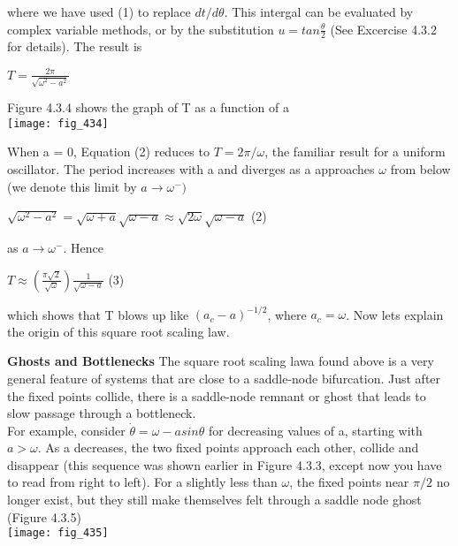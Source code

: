 \documentclass{article}
\newcommand\tab[1][1cm]{\hspace*{#1}}
\begin{document}
where we have used (1) to replace $dt/d\theta$. This intergal can be evaluated by complex variable methods, or by the substitution $u= tan \frac{\theta}{2}$ (See Excercise 4.3.2 for details). The result is 
\begin{center}
$T=\frac{2\pi}{\sqrt{\omega^{2}-a^{2}}}$
\end{center}

Figure 4.3.4 shows the graph of T as a function of a
\\ 

\texttt{[image: fig\_434]}

When a = 0, Equation (2) reduces to $T=2\pi/\omega$, the familiar result for a uniform oscillator. The period increases with a and diverges as a approaches $\omega$ from below (we denote this limit by $a \to \omega^{-})$ 
\begin{center}
$\sqrt{\omega^{2}-a^{2}}=\sqrt{\omega+a}\sqrt{\omega-a} \approx \sqrt{2\omega}\sqrt{\omega-a}$ \tab (2)
\end{center}
as $a \to \omega^{-}$. Hence 
\begin{center}
$T \approx (\frac{\pi \sqrt{2}}{\sqrt{\omega}}) \frac{1}{\sqrt{\omega-a}}$ \tab (3)
\end{center}
which shows that T blows up like $(a_{c}-a)^{-1/2}$, where $a_{c}=\omega$. Now lets explain the origin of this square root scaling law.

\textbf {Ghosts and Bottlenecks}
The square root scaling lawa found above is a very general feature of systems that are close to a saddle-node bifurcation. Just after the fixed points collide, there is a saddle-node remnant or ghost that leads to slow passage through a bottleneck. \\ \tab
For example, consider $\dot{\theta}=\omega-asin\theta$ for decreasing values of a, starting with $a>\omega$. As a decreases, the two fixed points approach each other, collide and disappear (this sequence was shown earlier in Figure 4.3.3, except now you have to read from right to left). For a slightly less than $\omega$, the fixed points near $\pi/2$ no longer exist, but they still make themselves felt through a saddle node ghost (Figure 4.3.5)
\\
\texttt{[image: fig\_435]}
\end{document}
